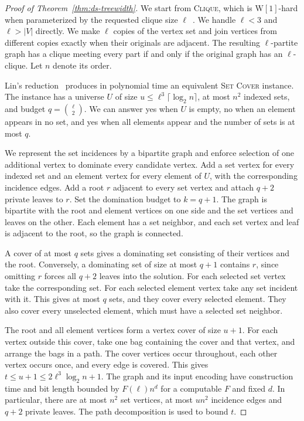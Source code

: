 \documentclass[11pt]{article}
\begin{document}
\begin{proof}[Proof of Theorem~\ref{thm:ds-treewidth}]
We start from \textsc{Clique}, which is \(\mathrm{W}[1]\)-hard when
parameterized by the requested clique size \(\ell\)~\cite{df}. We handle
\(\ell<3\) and \(\ell>|V|\) directly. We make \(\ell\) copies of the vertex
set and join vertices from different copies exactly when their originals are
adjacent. The resulting \(\ell\)-partite graph has a clique meeting every
part if and only if the original graph has an \(\ell\)-clique. Let \(n\)
denote its order.

Lin's reduction~\cite[Lemma~14]{lin} produces in polynomial time an
equivalent \textsc{Set Cover} instance. The instance has a universe \(U\) of
size \(u\le \ell^3\lceil\log_2 n\rceil\), at most \(n^2\) indexed sets, and
budget \(q=\binom{\ell}{2}\). We can answer yes when \(U\) is empty, no when
an element appears in no set, and yes when all elements appear and the
number of sets is at most \(q\).

We represent the set incidences by a bipartite graph and enforce selection
of one additional vertex to dominate every candidate vertex. Add a set
vertex for every indexed set and an element vertex for every element of
\(U\), with the corresponding incidence edges. Add a root \(r\) adjacent to
every set vertex and attach \(q+2\) private leaves to \(r\). Set the
domination budget to \(k=q+1\). The graph is bipartite with the root and
element vertices on one side and the set vertices and leaves on the other.
Each element has a set neighbor, and each set vertex and leaf is adjacent
to the root, so the graph is connected.

A cover of at most \(q\) sets gives a dominating set consisting of their
vertices and the root. Conversely, a dominating set of size at most \(q+1\)
contains \(r\), since omitting \(r\) forces all \(q+2\) leaves into the
solution. For each selected set vertex take the corresponding set. For
each selected element vertex take any set incident with it. This gives at
most \(q\) sets, and they cover every selected element. They also cover
every unselected element, which must have a selected set neighbor.

The root and all element vertices form a vertex cover of size \(u+1\).
For each vertex outside this cover, take one bag containing the cover and
that vertex, and arrange the bags in a path. The cover vertices occur
throughout, each other vertex occurs once, and every edge is covered.
This gives \(t\le u+1\le 2\ell^3\log_2 n+1\). The graph and its input
encoding have construction time and bit length bounded by \(F(\ell)n^d\)
for a computable \(F\) and fixed \(d\). In particular, there are at most
\(n^2\) set vertices, at most \(un^2\) incidence edges and \(q+2\) private
leaves. The path decomposition is used to bound \(t\).


\end{proof}
\end{document}
